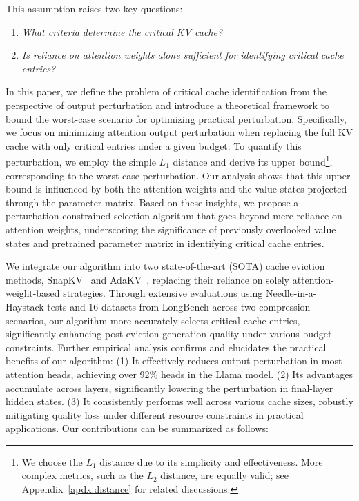 This assumption raises two key questions:
\begin{center}
\vspace{-0.4cm}
\colorbox{lightgray!20}{\parbox{0.98\linewidth}{
\begin{enumerate}
	\vspace{-0.05cm}
	\item  {\it What criteria determine the critical KV cache?}
	\vspace{-0.25cm}
	\item  {\it Is reliance on attention weights alone sufficient for identifying critical cache entries?}
	\vspace{-0.2cm}
\end{enumerate}
}}	
\vspace{-0.4cm}
\end{center}


In this paper, we define the problem of critical cache identification from the perspective of output perturbation and introduce a theoretical framework to bound the worst-case scenario for optimizing practical perturbation.
Specifically, we focus on minimizing attention output perturbation when replacing the full KV cache with only critical entries under a given budget.
To quantify this perturbation, we employ the simple $L_1$ distance and derive its upper bound\footnote{We choose the $L_1$ distance due to its simplicity and effectiveness. More complex metrics, such as the $L_2$ distance, are equally valid; see Appendix~\ref{apdx:distance} for related discussions.}, corresponding to the worst-case perturbation. Our analysis shows that this upper bound is influenced by both the attention weights and the value states projected through the parameter matrix. Based on these insights, we propose a perturbation-constrained selection algorithm that goes beyond mere reliance on attention weights, underscoring the significance of previously overlooked value states and pretrained parameter matrix in identifying critical cache entries.



We integrate our algorithm into two state-of-the-art (SOTA) cache eviction methods, SnapKV~\cite{SnapKV} and AdaKV~\cite{ada}, replacing their reliance on solely attention-weight-based strategies.
Through extensive evaluations using Needle-in-a-Haystack tests and 16 datasets from LongBench across two compression scenarios, our algorithm more accurately selects critical cache entries, significantly enhancing post-eviction generation quality under various budget constraints.
Further empirical analysis confirms and elucidates the practical benefits of our algorithm: (1) It effectively reduces output perturbation in most attention heads, achieving over 92\% heads in the Llama model. (2) Its advantages accumulate across layers, significantly lowering the perturbation in final-layer hidden states. (3) It consistently performs well across various cache sizes, robustly mitigating quality loss under different resource constraints in practical applications. Our contributions can be summarized as follows:

